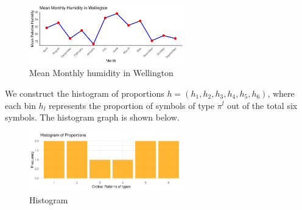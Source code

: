 \begin{figure}
	\centering
	\includegraphics[width=0.6\textwidth]{humidity graph}
	\caption{Mean Monthly humidity in Wellington}
\end{figure}

We construct the histogram of proportions $h=(h_1,h_2,h_3,h_4,h_5,h_6)$, where each bin $h_l$ represents the proportion of symbols of type $\pi^l$ out of the total six symbols. The histogram graph is shown below.

\begin{figure}
	\centering
	\includegraphics[width=0.6\textwidth]{frequency histogram}
	\caption{Histogram}
\end{figure}







